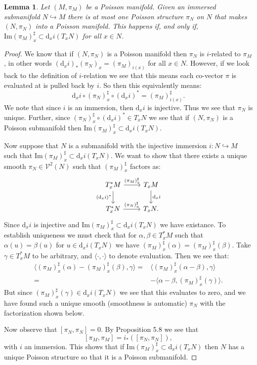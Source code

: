 \documentclass[psamsfonts,12pt]{amsart}
\newcommand\td{\mathrm{d}}
\newcommand\0{\mathbf{0}}
\theoremstyle{plain}
\newtheorem{lem}[thm]{Lemma}
\theoremstyle{definition}
\newcommand{\sV}{\mathcal{V}}
\begin{document}
\begin{lem}
Let $(M,\pi_M)$ be a Poisson manifold.  Given an immersed submanifold $N\hookrightarrow M$ there is at most one Poisson structure $\pi_N$ on $N$ that makes $(N,\pi_N)$ into a Poisson manifold.  This happens if, and only if, $\text{Im}(\pi_M)^\sharp_x \subset \td_x i(T_xN)$ for all $x\in N$.
\end{lem}
\begin{proof}
We know that if $(N,\pi_N)$ is a Poisson manifold then $\pi_N$ is $i$-related to $\pi_M$, in other words $(\td_x i)_* (\pi_N)_x =(\pi_M)_{i(x)}$ for all $x\in N$.  However, if we look back to the definition of $i$-relation we see that this means each co-vector $\pi$ is evaluated at is pulled back by $i$.  So then this equivalently means:
\[
\td_x i \circ (\pi_N)^\sharp_x \circ (\td_x i)^* = (\pi_M)^\sharp_{i(x)}.
\]
We note that since $i$ is an immersion, then $\td_x i$ is injective.  Thus we see that $\pi_N$ is unique.  Further, since $(\pi_N)^\sharp_x \circ (\td_x i)^* \in T_x N$ we see that if $(N,\pi_N)$ is a Poisson submanifold then $\text{Im}(\pi_M)^\sharp_x \subset \td_x i(T_x N)$.

Now suppose that $N$ is a submanifold with the injective immersion $i\colon N\hookrightarrow M$ such that $\text{Im}(\pi_M)^\sharp_x \subset \td_x i(T_x N)$.  We want to show that there exists a unique smooth $\pi_N\in \sV^2(N)$ such that $(\pi_M)_x^\sharp$ factors as:
\[
\begin{tikzcd}
T^*_x M\arrow{r}{(\pi_M)_x^\sharp} \arrow[swap]{d}{(\td_x i)^*} & T_xM \arrow{d}{\td_x i} \\
T^*_x N  \arrow{r}{(\pi_N)_x^\sharp} & T_x N.
\end{tikzcd}
\]
Since $\td_x i$ is injective and $\text{Im}(\pi_M)^\sharp_x\subset \td_x i(T_xN)$ we have existance.  To establish uniqueness we must check that for $\alpha,\beta\in T^*_xM$ such that $\alpha(u)=\beta(u)$ for $u\in \td_x i(T_x N)$ we have $(\pi_M)_x^\sharp(\alpha)=(\pi_M)_x^\sharp(\beta)$.  Take $\gamma \in T_x^*M$ to be arbitrary, and $\langle\cdot,\cdot\rangle$ to denote evaluation.  Then we see that:
\begin{align*}
\langle (\pi_M)^\sharp_x (\alpha)-(\pi_M)^\sharp_x(\beta),\gamma\rangle=& \langle (\pi_M)^\sharp_x(\alpha-\beta),\gamma\rangle\\
=& -\langle \alpha-\beta, (\pi_M)^\sharp_x(\gamma)\rangle.
\end{align*}
But since $(\pi_M)^\sharp_x(\gamma)\in \td_x i(T_xN)$ we see that this evaluates to zero, and we have found such a unique smooth (smoothness is automatic) $\pi_N$ with the factorization shown below.

Now observe that $[\pi_N,\pi_N]=0$.  By Proposition 5.8 we see that
\[
[\pi_M,\pi_M]=i_*([\pi_N,\pi_N]),
\]
with $i$ an immersion.  This shows that if $\text{Im}(\pi_M)^\sharp_x\subset \td_x i(T_xN)$ then $N$ has a unique Poisson structure so that it is a Poisson submanifold.
\end{proof}
\end{document}
